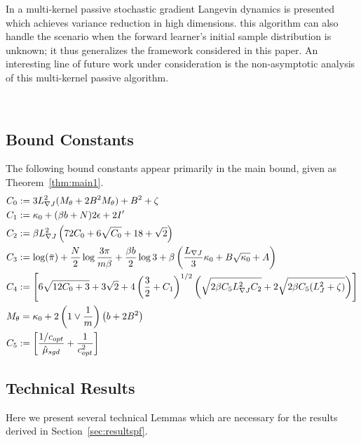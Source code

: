 \documentclass[journal,onecolumn]{IEEEtran}
\newcommand{\step}{\epsilon}
\newcommand{\grad}{\nabla}
\newcommand{\rew}{J}
\newcommand{\dimn}{N}
\newcommand{\kn}{\kappa_0}
\newcommand{\etsup}{M_{\theta}}
\newcommand{\constA}{A}
\newcommand{\constB}{B}
\newcommand{\idiffcc}{I'}
\newcommand{\dissm}{m}
\newcommand{\dissb}{b}
\newcommand{\gradnvar}{\zeta}
\newcommand{\lipJ}{L_J}
\newcommand{\lipGJ}{L_{\grad\rew}}
\newcommand{\sgdtm}{c_{opt}}
\begin{document}
{In \cite{krishnamurthy2021langevin} a multi-kernel passive stochastic gradient Langevin dynamics is presented which achieves variance reduction in high dimensions. this algorithm can also handle the scenario when the forward learner's initial sample distribution is unknown; it thus generalizes the framework considered in this paper. An interesting line of future work under consideration is the non-asymptotic analysis of this multi-kernel passive algorithm. 

\



\appendix

\subsection{Bound Constants}
\label{ap:bd_consts}
The following bound constants appear primarily in the main bound, given as Theorem~\ref{thm:main1}.
\begin{align*}
    \begin{split}
        &C_0 := 3\lipGJ^2(\etsup + 2B^2\etsup) + B^2 + \gradnvar \\
        &C_1 := \kn + (\beta \dissb + \dimn)2\step + 2 \idiffcc \\
        &C_2 := \beta \lipGJ^2\left(72C_0 + 6\sqrt{C_0} + 18+\sqrt{2}\right) \\
        &C_3 := \log(\bar{\pi}) + \frac{\dimn}{2} \log\frac{3\pi}{\dissm\beta} + \frac{\beta \dissb}{2}\log3 + \beta\left(\frac{\lipGJ}{3}\kn + \constB\sqrt{\kn} + \constA\right)\\
        &C_4 := \left[6\sqrt{12C_0 + 3} + 3\sqrt{2} + 4\left(\frac{3}{2} + C_1 \right)^{1/2}{\color{black}\left(\sqrt{2\beta C_5 \lipGJ^2 C_2} + 2\sqrt{2\beta C_5(\lipJ^2 + \gradnvar)} \right)}\right]\\
        &\etsup = \kn + 2\left(1 \vee \frac{1}{\dissm}\right)\left(\dissb + 2\constB^2\right) \\
        &{\color{black}C_5 := \left[\frac{1/\sgdtm}{\hat{\mu}_{sgd}} + \frac{1}{\sgdtm^2} \right]}
    \end{split}
\end{align*}

\subsection{Technical Results}
\label{subsec:techres}
Here we present several technical Lemmas which are necessary for the results derived in Section~\ref{sec:resultspf}.

}
\end{document}
